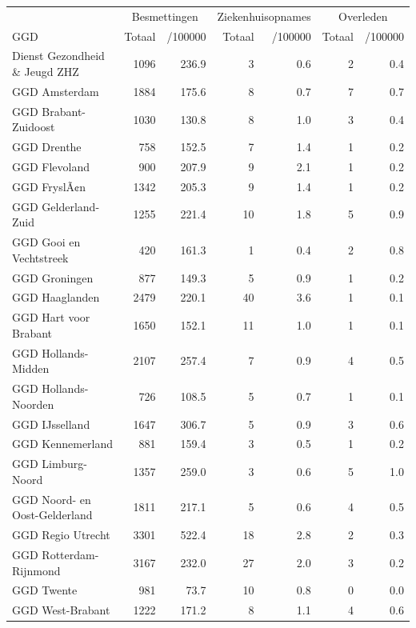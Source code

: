 \documentclass[
  english,
  man,floatsintext]{apa6}
\begin{document}
\begin{table}
\centering\begingroup\fontsize{10}{12}\selectfont

\begin{threeparttable}
\begin{tabular}{lrrrrrr}
\toprule
\multicolumn{1}{c}{ } & \multicolumn{2}{c}{Besmettingen} & \multicolumn{2}{c}{Ziekenhuisopnames} & \multicolumn{2}{c}{Overleden} \\
\cmidrule(l{3pt}r{3pt}){2-3} \cmidrule(l{3pt}r{3pt}){4-5} \cmidrule(l{3pt}r{3pt}){6-7}
GGD & Totaal & /100000 & Totaal & /100000 & Totaal & /100000\\
\midrule
Dienst Gezondheid \& Jeugd ZHZ & 1096 & 236.9 & 3 & 0.6 & 2 & 0.4\\
GGD Amsterdam & 1884 & 175.6 & 8 & 0.7 & 7 & 0.7\\
GGD Brabant-Zuidoost & 1030 & 130.8 & 8 & 1.0 & 3 & 0.4\\
GGD Drenthe & 758 & 152.5 & 7 & 1.4 & 1 & 0.2\\
GGD Flevoland & 900 & 207.9 & 9 & 2.1 & 1 & 0.2\\
GGD FryslÃ¢n & 1342 & 205.3 & 9 & 1.4 & 1 & 0.2\\
GGD Gelderland-Zuid & 1255 & 221.4 & 10 & 1.8 & 5 & 0.9\\
GGD Gooi en Vechtstreek & 420 & 161.3 & 1 & 0.4 & 2 & 0.8\\
GGD Groningen & 877 & 149.3 & 5 & 0.9 & 1 & 0.2\\
GGD Haaglanden & 2479 & 220.1 & 40 & 3.6 & 1 & 0.1\\
GGD Hart voor Brabant & 1650 & 152.1 & 11 & 1.0 & 1 & 0.1\\
GGD Hollands-Midden & 2107 & 257.4 & 7 & 0.9 & 4 & 0.5\\
GGD Hollands-Noorden & 726 & 108.5 & 5 & 0.7 & 1 & 0.1\\
GGD IJsselland & 1647 & 306.7 & 5 & 0.9 & 3 & 0.6\\
GGD Kennemerland & 881 & 159.4 & 3 & 0.5 & 1 & 0.2\\
GGD Limburg-Noord & 1357 & 259.0 & 3 & 0.6 & 5 & 1.0\\
GGD Noord- en Oost-Gelderland & 1811 & 217.1 & 5 & 0.6 & 4 & 0.5\\
GGD Regio Utrecht & 3301 & 522.4 & 18 & 2.8 & 2 & 0.3\\
GGD Rotterdam-Rijnmond & 3167 & 232.0 & 27 & 2.0 & 3 & 0.2\\
GGD Twente & 981 & 73.7 & 10 & 0.8 & 0 & 0.0\\
GGD West-Brabant & 1222 & 171.2 & 8 & 1.1 & 4 & 0.6\\

\end{tabular}
\end{threeparttable}
\end{table}
\end{document}
